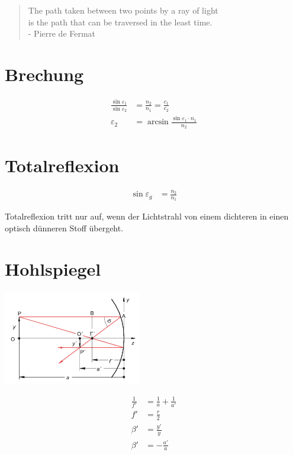 \begin{quote}
The path taken between two points by a ray of light\\is the path that can be traversed in the least time.\\- Pierre de Fermat
\end{quote}  

\begin{multicols}{2}
\section{Brechung}
\begin{align*}
\frac{\sin{\varepsilon_1}}{\sin{\varepsilon_2}}&=\frac{n_2}{n_1}=\frac{c_1}{c_2}\\
\varepsilon_2&=\arcsin{\frac{\sin{\varepsilon_1}\cdot n_1}{n_2}}
\end{align*}

\section{Totalreflexion}
\begin{align*}
\sin{\varepsilon_g}&=\frac{n_2}{n_1}
\end{align*}



Totalreflexion tritt nur auf, wenn der Lichtstrahl von einem dichteren in einen optisch
dünneren Stoff übergeht.

\end{multicols}

\section{Hohlspiegel}
\begin{multicols}{2}
\begin{center}
 \includegraphics[width=60mm,keepaspectratio=true]{./Physik/Bilder/Hohlspiegel.png}
\end{center}

\begin{align*}
\frac{1}{f'}&=\frac{1}{a}+\frac{1}{a'}\\
f'&=\frac{r}{2}\\
\beta'&=\frac{y'}{y}\\
\beta'&=-\frac{a'}{a}
\end{align*}
\end{multicols}

